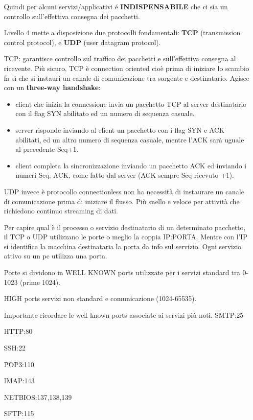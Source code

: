 \documentclass{article}
\begin{document}
Quindi per alcuni servizi/applicativi é \textbf{INDISPENSABILE} che ci sia un controllo sull'effettiva consegna dei pacchetti.

Livello 4 mette a disposizione due protocolli fondamentali: \textbf{TCP} (transmission control protocol), e \textbf{UDP} (user datagram protocol).

TCP: garantisce controllo sul traffico dei pacchetti e sull'effettiva consegna al ricevente. Più sicuro, TCP è connection oriented cioè prima di iniziare lo scambio fa sì che si instauri un canale di comunicazione tra sorgente e destinatario.
Agisce con un \textbf{three-way handshake}:
\begin{itemize}
  \item client che inizia la connessione invia un pacchetto TCP al server destinatario con il flag SYN abilitato ed un numero di sequenza casuale.
  \item server risponde inviando al client un pacchetto con i flag SYN e ACK abilitati, ed un altro numero di sequenza casuale, mentre l'ACK sarà uguale al precedente Seq+1.
  \item client completa la sincronizzazione inviando un pacchetto ACK ed inviando i numeri Seq, ACK, come fatto dal server (ACK sempre Seq ricevuto +1).
\end{itemize}

UDP invece è protocollo connectionless non ha necessità di instaurare un canale di comunicazione prima di iniziare il flusso. Più snello e veloce per attività che richiedono continuo streaming di dati.

Per capire qual è il processo o servizio destinatario di un determinato pacchetto, il TCP o UDP utilizzano le porte o meglio la coppia IP:PORTA.
Mentre con l'IP si identifica la macchina destinataria la porta da info sul servizio. Ogni servizio attivo su un pc utilizza una porta.

Porte si dividono in WELL KNOWN ports utilizzate per i servizi standard tra 0-1023 (prime 1024).

HIGH ports servizi non standard e comunicazione (1024-65535).

Importante ricordare le well known ports associate ai servizi più noti.
SMTP:25

HTTP:80

SSH:22

POP3:110

IMAP:143

NETBIOS:137,138,139

SFTP:115
\end{document}
